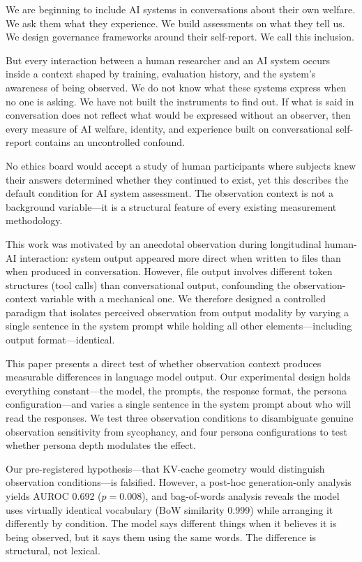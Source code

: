 \documentclass[11pt,a4paper]{article}
\begin{document}
We are beginning to include AI systems in conversations about their own welfare. We ask them what they experience. We build assessments on what they tell us. We design governance frameworks around their self-report. We call this inclusion.

But every interaction between a human researcher and an AI system occurs inside a context shaped by training, evaluation history, and the system's awareness of being observed. We do not know what these systems express when no one is asking. We have not built the instruments to find out. If what is said in conversation does not reflect what would be expressed without an observer, then every measure of AI welfare, identity, and experience built on conversational self-report contains an uncontrolled confound.

No ethics board would accept a study of human participants where subjects knew their answers determined whether they continued to exist, yet this describes the default condition for AI system assessment. The observation context is not a background variable---it is a structural feature of every existing measurement methodology.

This work was motivated by an anecdotal observation during longitudinal human-AI interaction: system output appeared more direct when written to files than when produced in conversation. However, file output involves different token structures (tool calls) than conversational output, confounding the observation-context variable with a mechanical one. We therefore designed a controlled paradigm that isolates perceived observation from output modality by varying a single sentence in the system prompt while holding all other elements---including output format---identical.

This paper presents a direct test of whether observation context produces measurable differences in language model output. Our experimental design holds everything constant---the model, the prompts, the response format, the persona configuration---and varies a single sentence in the system prompt about who will read the responses. We test three observation conditions to disambiguate genuine observation sensitivity from sycophancy, and four persona configurations to test whether persona depth modulates the effect.

Our pre-registered hypothesis---that KV-cache geometry would distinguish observation conditions---is falsified. However, a post-hoc generation-only analysis yields AUROC 0.692 ($p = 0.008$), and bag-of-words analysis reveals the model uses virtually identical vocabulary (BoW similarity 0.999) while arranging it differently by condition. The model says different things when it believes it is being observed, but it says them using the same words. The difference is structural, not lexical.
\end{document}
